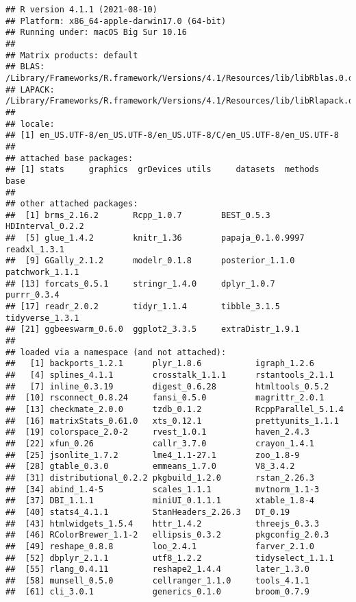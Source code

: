 \documentclass[
  11pt,
  english,
  ,doc,floatsintext]{apa6}
\begin{document}
\begin{verbatim}
## R version 4.1.1 (2021-08-10)
## Platform: x86_64-apple-darwin17.0 (64-bit)
## Running under: macOS Big Sur 10.16
## 
## Matrix products: default
## BLAS:   /Library/Frameworks/R.framework/Versions/4.1/Resources/lib/libRblas.0.dylib
## LAPACK: /Library/Frameworks/R.framework/Versions/4.1/Resources/lib/libRlapack.dylib
## 
## locale:
## [1] en_US.UTF-8/en_US.UTF-8/en_US.UTF-8/C/en_US.UTF-8/en_US.UTF-8
## 
## attached base packages:
## [1] stats     graphics  grDevices utils     datasets  methods   base     
## 
## other attached packages:
##  [1] brms_2.16.2       Rcpp_1.0.7        BEST_0.5.3        HDInterval_0.2.2 
##  [5] glue_1.4.2        knitr_1.36        papaja_0.1.0.9997 readxl_1.3.1     
##  [9] GGally_2.1.2      modelr_0.1.8      posterior_1.1.0   patchwork_1.1.1  
## [13] forcats_0.5.1     stringr_1.4.0     dplyr_1.0.7       purrr_0.3.4      
## [17] readr_2.0.2       tidyr_1.1.4       tibble_3.1.5      tidyverse_1.3.1  
## [21] ggbeeswarm_0.6.0  ggplot2_3.3.5     extraDistr_1.9.1 
## 
## loaded via a namespace (and not attached):
##   [1] backports_1.2.1      plyr_1.8.6           igraph_1.2.6        
##   [4] splines_4.1.1        crosstalk_1.1.1      rstantools_2.1.1    
##   [7] inline_0.3.19        digest_0.6.28        htmltools_0.5.2     
##  [10] rsconnect_0.8.24     fansi_0.5.0          magrittr_2.0.1      
##  [13] checkmate_2.0.0      tzdb_0.1.2           RcppParallel_5.1.4  
##  [16] matrixStats_0.61.0   xts_0.12.1           prettyunits_1.1.1   
##  [19] colorspace_2.0-2     rvest_1.0.1          haven_2.4.3         
##  [22] xfun_0.26            callr_3.7.0          crayon_1.4.1        
##  [25] jsonlite_1.7.2       lme4_1.1-27.1        zoo_1.8-9           
##  [28] gtable_0.3.0         emmeans_1.7.0        V8_3.4.2            
##  [31] distributional_0.2.2 pkgbuild_1.2.0       rstan_2.26.3        
##  [34] abind_1.4-5          scales_1.1.1         mvtnorm_1.1-3       
##  [37] DBI_1.1.1            miniUI_0.1.1.1       xtable_1.8-4        
##  [40] stats4_4.1.1         StanHeaders_2.26.3   DT_0.19             
##  [43] htmlwidgets_1.5.4    httr_1.4.2           threejs_0.3.3       
##  [46] RColorBrewer_1.1-2   ellipsis_0.3.2       pkgconfig_2.0.3     
##  [49] reshape_0.8.8        loo_2.4.1            farver_2.1.0        
##  [52] dbplyr_2.1.1         utf8_1.2.2           tidyselect_1.1.1    
##  [55] rlang_0.4.11         reshape2_1.4.4       later_1.3.0         
##  [58] munsell_0.5.0        cellranger_1.1.0     tools_4.1.1         
##  [61] cli_3.0.1            generics_0.1.0       broom_0.7.9         

\end{verbatim}
\end{document}
